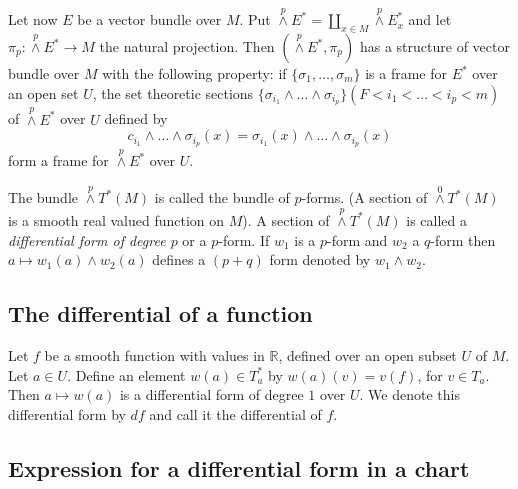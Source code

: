 Let now $E$ be a vector bundle over $M$. Put ${\displaystyle{\mathop{\wedge}\limits^{p}}}E^{*}=\coprod\limits_{x\in M}{\displaystyle{\mathop{\wedge}\limits^{p}}}E^{*}_{x}$ and let $\pi_{p}:{\displaystyle{\mathop{\wedge}\limits^{p}}}E^{*}\to M$ the natural projection. Then $({\displaystyle{\mathop{\wedge}\limits^{p}}}E^{*},\pi_{p})$ has a structure of vector bundle over $M$ with the following property: if $\{\sigma_{1},\ldots,\sigma_{m}\}$ is a frame for $E^{*}$ over an open set $U$, the set theoretic sections $\{\sigma_{i_{1}}\wedge\ldots \wedge \sigma_{i_{p}}\}(F<i_{1}<\ldots < i_{p}<m)$ of ${\displaystyle{\mathop{\wedge}\limits^{p}}}E^{*}$ over $U$ defined by
$$
c_{i_{1}}\wedge\ldots\wedge \sigma_{i_{p}}(x)=\sigma_{i_{1}}(x)\wedge\ldots\wedge \sigma_{i_{p}}(x)
$$
form a frame for ${\displaystyle{\mathop{\wedge}\limits^{p}}}E^{*}$ over $U$.

The bundle ${\displaystyle{\mathop{\wedge}\limits^{p}}}T^{*}(M)$ is called the bundle of $p$-forms. (A section of ${\displaystyle{\mathop{\wedge}\limits^{0}}}T^{*}(M)$ is a smooth real valued function on $M$). A section of ${\displaystyle{\mathop{\wedge}\limits^{p}}}T^{*}(M)$ is called a {\em differential form of degree $p$} or a $p$-form. If $w_{1}$ is a $p$-form and $w_{2}$ a $q$-form then $a\mapsto w_{1}(a)\wedge w_{2}(a)$ defines a $(p+q)$ form denoted by $w_{1}\wedge w_{2}$.

\subsection*{The differential of a function}

Let $f$ be a smooth function with values in $\mathbb{R}$, defined over an open subset $U$ of $M$. Let $a\in U$. Define an element $w(a)\in T^{*}_{a}$ by $w(a)(v)=v(f)$, for $v\in T_{a}$. Then $a\mapsto w(a)$ is a differential form of degree $1$ over $U$. We denote this differential form by $df$ and call it the differential of $f$.

\subsection*{Expression for a differential form in a chart}
\pageoriginale

